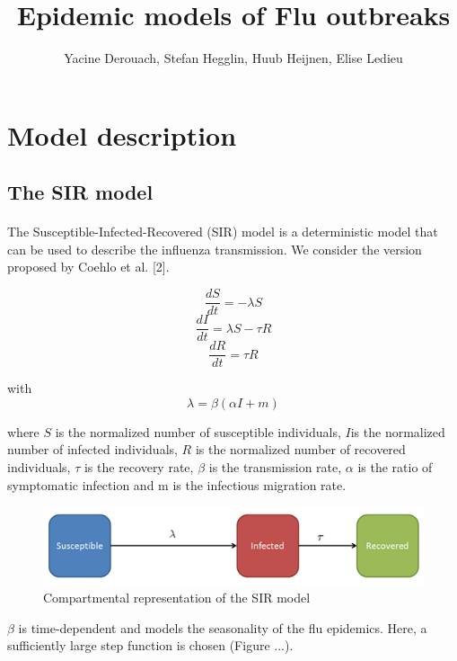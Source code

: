 \documentclass[11pt, a4paper]{article}
\author{Yacine Derouach, Stefan Hegglin, Huub Heijnen, Elise Ledieu}
\title{Epidemic models of Flu outbreaks}
\begin{document}
\maketitle

\section{Model description}
\subsection{The SIR model}
\paragraph{}
The Susceptible-Infected-Recovered (SIR) model is a deterministic model that can be used to describe the influenza transmission. We consider the version proposed by Coehlo et al. [2].

\begin{equation}
\frac{dS}{dt} = - \lambda S
\end{equation}
\begin{equation}
\frac{dI}{dt} = \lambda S - \tau R
\end{equation}
\begin{equation}
\frac{dR}{dt} = \tau R
\end{equation}

with \[ \lambda = \beta (\alpha I + m) \]

where $S$ is the normalized number of susceptible individuals, $I$is the normalized number of infected individuals, $R$ is the normalized number of recovered individuals, $\tau $ is the recovery rate, $\beta $ is the transmission rate, $\alpha$ is the ratio of symptomatic infection and m is the infectious migration rate.

\begin{figure}[h]
\center
   \includegraphics[width = \textwidth]{picture1.png}
   \caption{\label{1} Compartmental representation of the SIR model}
\end{figure}

$\beta$ is time-dependent and models the seasonality of the flu epidemics. Here, a sufficiently large step function is chosen (Figure ...).
\end{document}
